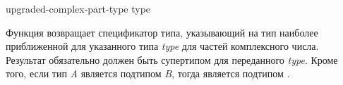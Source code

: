 \begin{defun}[Функция]
upgraded-complex-part-type type

Функция возвращает спецификатор типа, указывающий на тип наиболее
приближенной для указанного типа \emph{type} для частей комплексного числа.
Результат обязательно должен быть супертипом для переданного \emph{type}.
Кроме того, если тип \emph{A} является подтипом \emph{B}, тогда
 является подтипом 
.
\end{defun}

\fi